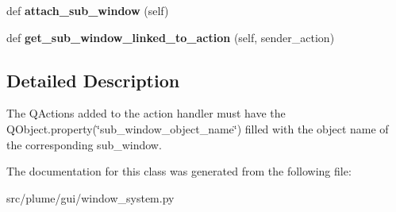 \begin{DoxyCompactItemize}
\item 
def {\bfseries attach\+\_\+sub\+\_\+window} (self)\hypertarget{classplume-creator_1_1src_1_1plume_1_1gui_1_1window__system_1_1_window_system_action_handler_a82c27b5bba53a9a42420adb49cdcdea0}{}\label{classplume-creator_1_1src_1_1plume_1_1gui_1_1window__system_1_1_window_system_action_handler_a82c27b5bba53a9a42420adb49cdcdea0}

\item 
def {\bfseries get\+\_\+sub\+\_\+window\+\_\+linked\+\_\+to\+\_\+action} (self, sender\+\_\+action)\hypertarget{classplume-creator_1_1src_1_1plume_1_1gui_1_1window__system_1_1_window_system_action_handler_a0aabfe208b44c7cbafb0f380a8e0e874}{}\label{classplume-creator_1_1src_1_1plume_1_1gui_1_1window__system_1_1_window_system_action_handler_a0aabfe208b44c7cbafb0f380a8e0e874}

\end{DoxyCompactItemize}


\subsection{Detailed Description}
The Q\+Actions added to the action handler must have the Q\+Object.\+property(\char`\"{}sub\+\_\+window\+\_\+object\+\_\+name\char`\"{}) filled with the object name of the corresponding sub\+\_\+window. 

The documentation for this class was generated from the following file\+:\begin{DoxyCompactItemize}
\item 
src/plume/gui/window\+\_\+system.\+py\end{DoxyCompactItemize}

